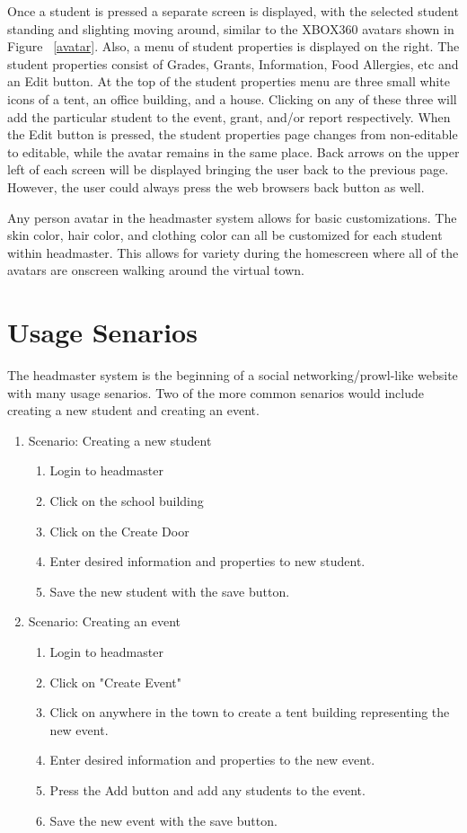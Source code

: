 \documentclass[11pt]{article}
\begin{document}
Once a student is pressed a separate screen is displayed, with the selected student standing and slighting moving around, similar to the XBOX360 avatars shown in Figure ~\ref{avatar}. Also, a menu of student properties is displayed on the right. The student properties consist of Grades, Grants, Information, Food Allergies, etc and an Edit button. At the top of the student properties menu are three small white icons of a tent, an office building, and a house. Clicking on any of these three will add the particular student to the event, grant, and/or report respectively. When the Edit button is pressed, the student properties page changes from non-editable to editable, while the avatar remains in the same place. Back arrows on the upper left of each screen will be displayed bringing the user back to the previous page. However, the user could always press the web browsers back button as well.

Any person avatar in the headmaster system allows for basic customizations. The skin color, hair color, and clothing color can all be customized for each student within headmaster. This allows for variety during the homescreen where all of the avatars are onscreen walking around the virtual town.

\section{Usage Senarios}
The headmaster system is the beginning of a social networking/prowl-like website with many usage senarios. Two of the more common senarios would include creating a new student and creating an event.
\begin{enumerate}
    \item Scenario: Creating a new student
  \begin{enumerate}
        \item Login to headmaster
        \item Click on the school building
        \item Click on the Create Door
        \item Enter desired information and properties to new student.
        \item Save the new student with the save button.
  \end{enumerate}
    \item Scenario: Creating an event
  \begin{enumerate}
        \item Login to headmaster
        \item Click on "Create Event"
        \item Click on anywhere in the town to create a tent building representing the new event.
        \item Enter desired information and properties to the new event.
        \item Press the Add button and add any students to the event.
        \item Save the new event with the save button.
  \end{enumerate}
\end{enumerate}
\end{document}

